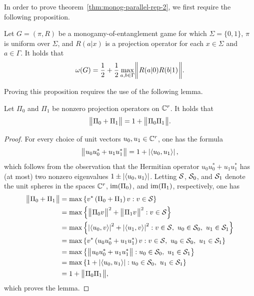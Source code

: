 In order to prove theorem~\ref{thm:monog-parallel-rep-2}, we first require the following proposition. 
\begin{prop} \label{prop:monogamy-unentangled}
	Let $G = (\pi,R)$ be a monogamy-of-entanglement game for which $\Sigma = \{0,1\}$, $\pi$ is uniform over $\Sigma$, and $R(a|x)$ is a projection operator for each $x \in \Sigma$ and $a \in \Gamma$. It holds that 
	\begin{align}
		\omega(G) = \frac{1}{2} + \frac{1}{2} \max_{a,b \in \Gamma} \biggnorm{R(a|0)R(b|1)}.
	\end{align}
\end{prop}
Proving this proposition requires the use of the following lemma.
\begin{lemma} \label{lem:monogamy-projections}
	Let $\Pi_0$ and $\Pi_1$ be nonzero projection operators on $\complex^r$. It holds that 
	\begin{align}
		\bignorm{\Pi_0 + \Pi_1} = 1 + \bignorm{\Pi_0 \Pi_1}.
	\end{align}
\end{lemma}

\begin{proof}
	For every choice of unit vectors $u_0, u_1 \in \complex^r$, one has the formula
	\begin{align}
		\bignorm{ u_0 u_0^* + u_1 u_1^* } = 1 + \abs{\ip{u_0}{u_1}},
	\end{align}
	which follows from the observation that the Hermitian operator $u_0 u_0^* + u_1 u_1^*$ has (at most) two nonzero eigenvalues $1 \pm \abs{\ip{u_0}{u_1}}$. Letting $\S$, $\S_0$, and $\S_1$ denote the unit spheres in the spaces $\complex^r$, $\im(\Pi_0)$, and $\im(\Pi_1)$, respectively, one has 
	\begin{equation}
		\begin{aligned}
			\bignorm{\Pi_0 + \Pi_1} &= \max \left \{ v^* \left( \Pi_0 + \Pi_1 \right) v : v \in \S \right \} \\
			&= \max \left \{ \bignorm{\Pi_0 v}^2 + \bignorm{\Pi_1 v}^2 : v \in \S \right \} \\
			&= \max \left \{ \abs{\ip{u_0}{v}}^2 + \abs{\ip{u_1}{v}}^2 : v \in \S, \ u_0 \in \S_0, \ u_1 \in \S_1 \right \} \\
			&= \max \left \{ v^* \left( u_0 u_0^* + u_1 u_1^* \right)v : v \in \S, \ u_0 \in \S_0, \ u_1 \in \S_1 \right \} \\
			&= \max \left \{ \bignorm{u_0 u_0^* + u_1 u_1^*} : u_0 \in \S_0, \ u_1 \in \S_1 \right \} \\
			&= \max \left \{ 1 + \abs{\ip{u_0}{u_1}} : u_0 \in \S_0, \ u_1 \in \S_1 \right \} \\
			&= 1 + \bignorm{\Pi_0 \Pi_1},
		\end{aligned}
	\end{equation}
which proves the lemma. 
\end{proof}

